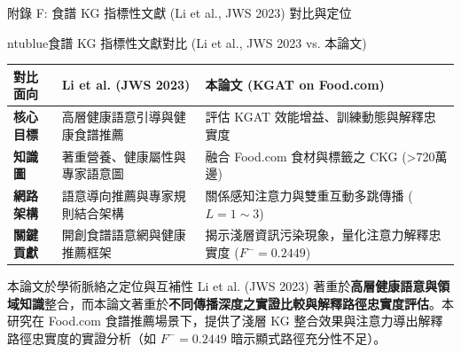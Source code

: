 \documentclass[aspectratio=169, 10pt]{beamer}
\begin{document}
\begin{frame}{附錄 F: 食譜 KG 指標性文獻 (Li et al., JWS 2023) 對比與定位}
  \begin{mybox}{ntublue}{{食譜 KG 指標性文獻對比 (Li et al., JWS 2023 vs. 本論文)}}
    \scriptsize
    \setlength{\tabcolsep}{2.5pt}
    \renewcommand{\arraystretch}{0.80}
    \begin{tabularx}{\textwidth}{l X X}
      \toprule
      \textbf{對比面向} & \textbf{Li et al. (JWS 2023)} & \textbf{本論文 (KGAT on Food.com)} \\
      \midrule
      \textbf{核心目標} & 高層健康語意引導與健康食譜推薦 & 評估 KGAT 效能增益、訓練動態與解釋忠實度 \\
      \midrule
      \textbf{知識圖} & 著重營養、健康屬性與專家語意圖 & 融合 Food.com 食材與標籤之 CKG (>720萬邊) \\
      \midrule
      \textbf{網路架構} & 語意導向推薦與專家規則結合架構 & 關係感知注意力與雙重互動多跳傳播 ($L=1\sim3$) \\
      \midrule
      \textbf{關鍵貢獻} & 開創食譜語意網與健康推薦框架 & 揭示淺層資訊污染現象，量化注意力解釋忠實度 ($F^-=0.2449$) \\
      \bottomrule
    \end{tabularx}
  \end{mybox}

  \vspace{-0.35cm}
  \begin{alertblock}{\small 本論文於學術脈絡之定位與互補性}
    \footnotesize
    Li et al. (JWS 2023) 著重於\textbf{高層健康語意與領域知識}整合，而本論文著重於\textbf{不同傳播深度之實證比較與解釋路徑忠實度評估}。本研究在 Food.com 食譜推薦場景下，提供了淺層 KG 整合效果與注意力導出解釋路徑忠實度的實證分析（如 $F^- = 0.2449$ 暗示顯式路徑充分性不足）。
  \end{alertblock}
\end{frame}
\end{document}
